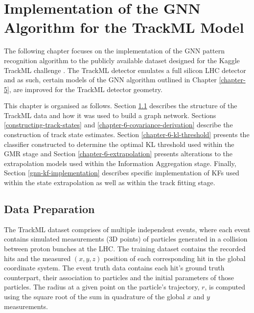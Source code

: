 


\chapter{Implementation of the GNN Algorithm for the TrackML Model}
\label{chapter-6}

The following chapter focuses on the implementation of the GNN pattern recognition algorithm to the publicly available dataset designed for the Kaggle TrackML challenge \cite{kaggle-trackml}. The TrackML detector emulates a full silicon LHC detector and as such, certain models of the GNN algorithm outlined in Chapter \ref{chapter-5}, are improved for the TrackML detector geometry.

This chapter is organised as follows. Section \ref{chapter-6-data-prep} describes the structure of the TrackML data and how it was used to build a graph network. Sections \ref{constructing-track-states} and \ref{chapter-6-covariance-derivation} describe the construction of track state estimates. Section \ref{chapter-6-kl-threshold} presents the classifier constructed to determine the optimal KL threshold used within the GMR stage and Section \ref{chapter-6-extrapolation} presents alterations to the extrapolation models used within the Information Aggregation stage. Finally, Section \ref{gnn-kf-implementation} describes specific implementation of KFs used within the state extrapolation as well as within the track fitting stage. 
 





\section{Data Preparation}
\label{chapter-6-data-prep}

The TrackML dataset \cite{kaggle-trackml-data} comprises of multiple independent events, where each event contains simulated measurements (3D points) of particles generated in a collision between proton bunches at the LHC. The training dataset contains the recorded hits and the measured $(x, y, z)$ position of each corresponding hit in the global coordinate system. The event truth data contains each hit's ground truth counterpart, their association to particles and the initial parameters of those particles. The radius at a given point on the particle's trajectory, $r$, is computed using the square root of the sum in quadrature of the global $x$ and $y$ measurements.

